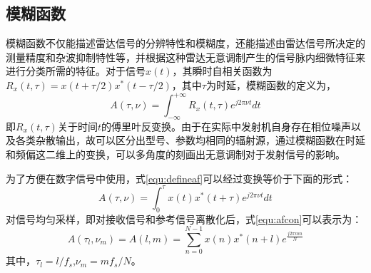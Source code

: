 \subsection{模糊函数}

模糊函数不仅能描述雷达信号的分辨特性和模糊度，还能描述由雷达信号所决定的测量精度和杂波抑制特性等，并根据这种雷达无意调制产生的信号脉内细微特征来进行分类所需的特征。对于信号$x(t)$，其瞬时自相关函数为$R_x(t,\tau)=x(t+\tau/2)x^{*}(t-\tau/2)$，其中$\tau$为时延，模糊函数的定义为，
\begin{equation}
A(\tau,\nu) = \int_{-\infty}^{+\infty}R_x(t,\tau)e^{j2\pi\nu t}dt
\label{equ:defineaf}
\end{equation}
即$R_x(t,\tau)$关于时间$t$的傅里叶反变换。由于在实际中发射机自身存在相位噪声以及各类杂散输出，故可以区分出型号、参数均相同的辐射源，通过模糊函数在时延和频偏这二维上的变换，可以多角度的刻画出无意调制对于发射信号的影响。

为了方便在数字信号中使用，式\ref{equ:defineaf}可以经过变换等价于下面的形式：
\begin{equation}
A(\tau,\nu) = \int_{0}^{\tau}x(t)x^{*}(t+\tau)e^{j2\pi\nu t}dt
\label{equ:afcon}
\end{equation}
对信号均匀采样，即对接收信号和参考信号离散化后，式\ref{equ:afcon}可以表示为：
\begin{equation}
A(\tau_l,\nu_m) = A(l, m) = \sum_{n = 0}^{N-1}x(n)x^{*}(n+l)e^{\frac{j2\pi m n}{N}}	
\end{equation}
其中，$\tau_l=l/f_s$,$\nu_m=mf_s/N$。

